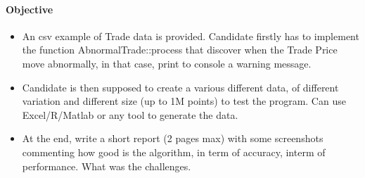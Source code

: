 \documentclass{exam}%
\begin{document}
\paragraph{Objective}
\begin{itemize}
	\item An csv example of Trade data is provided. Candidate firstly has to implement the function AbnormalTrade::process that discover when the Trade Price move abnormally, in that case, print to console a warning message.
	\item Candidate is then supposed to create a various different data, of different variation and different size (up to 1M points) to test the program. Can use Excel/R/Matlab or any tool to generate the data. 
	\item At the end, write a short report (2 pages max) with some screenshots commenting how good is the algorithm, in term of accuracy, interm of performance. What was the challenges.
\end{itemize}
\end{document}
